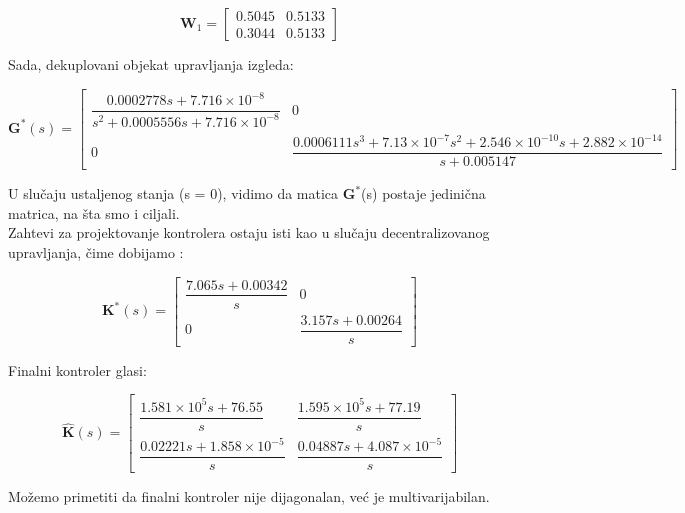 \documentclass[a4paper,11pt]{article}
\theoremstyle{definition} \newtheorem{deff}{Definicija}[section]
\theoremstyle{definition} \newtheorem{prim}[deff]{Primer}
\theoremstyle{plain} \newtheorem{teor}[deff]{Teorema}
\begin{document}
	\begin{equation}
		\textbf{W}_1 = \begin{bmatrix} 0.5045  &  0.5133 \\  0.3044  &  0.5133 \end{bmatrix}
	\end{equation}
	
	\vspace{1cm}
	Sada, dekuplovani objekat upravljanja izgleda: 
	
	\begin{equation}
		\textbf{G}^*(s) = \begin{bmatrix} 
			\dfrac{0.0002778s + 7.716 \times 10^{-8}}{s^2 + 0.0005556s + 7.716 \times 10^{-8}} & 0 \\
			0 & \dfrac{0.0006111s^3 + 7.13 \times 10^{-7}s^2 + 2.546 \times 10^{-10}s + 2.882 \times 10^{-14}}{s + 0.005147}
		\end{bmatrix}
	\end{equation}
	
	
	U slučaju ustaljenog stanja (s = 0), vidimo da matica $\textbf{G}^*$(s) postaje jedinična matrica, na šta smo i ciljali. \\
	
	\vspace{1cm}
	Zahtevi za projektovanje kontrolera ostaju isti kao u slučaju decentralizovanog upravljanja, čime dobijamo :
	
	\begin{equation}
		\textbf{K}^*(s) = \begin{bmatrix} 
			\dfrac{7.065s + 0.00342}{s} & 0 \\
			0 & \dfrac{3.157s + 0.00264}{s}
		\end{bmatrix}
	\end{equation}
	
	\vspace{1cm}
	\noindent Finalni kontroler glasi: 
	
	\begin{equation}
		\hat{\textbf{K}}(s) = \begin{bmatrix}  
			\dfrac{1.581 \times 10^5s + 76.55}{s} & \dfrac{1.595 \times 10^5s + 77.19}{s} \\
			\dfrac{0.02221s + 1.858 \times 10^{-5}}{s} & \dfrac{0.04887s + 4.087 \times 10^{-5}}{s}
		\end{bmatrix}
	\end{equation}
	
	
	Možemo primetiti da finalni kontroler nije dijagonalan, već je multivarijabilan. 
	
\end{document}
